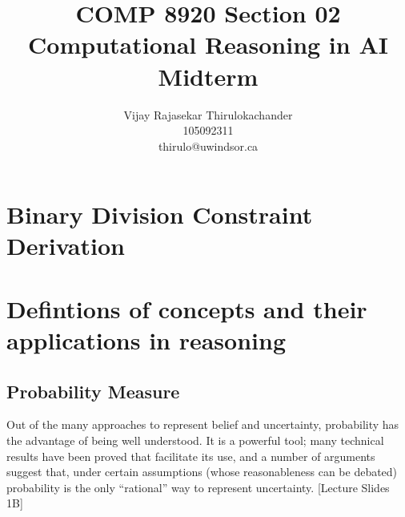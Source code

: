 \documentclass[UTF8]{article}
\begin{document}
    
\title{COMP 8920 Section 02\\ Computational Reasoning in AI \\Midterm}
\author{
    Vijay Rajasekar Thirulokachander \\
    \large 105092311 \\
    \large thirulo@uwindsor.ca
}
\maketitle
\date{}


\section{Binary Division Constraint Derivation}
\section{Defintions of concepts and their applications in reasoning}
\subsection{Probability Measure}

Out of the many approaches to represent belief and uncertainty, probability has the advantage of being well understood.  It is a powerful tool; many technical results have been proved that facilitate its use, and a number of arguments suggest that, under certain assumptions (whose reasonableness can be debated) probability is the only “rational” way to represent uncertainty. [Lecture Slides 1B]\\
\end{document}
